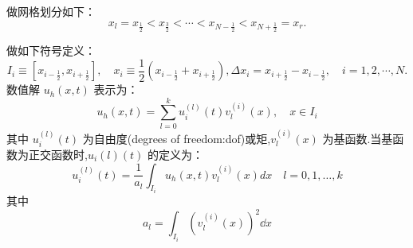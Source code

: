 \documentclass{book}
\begin{document}
做网格划分如下：
\begin{equation}
    x_{l}=x_{\frac{1}{2}}<x_{\frac{3}{2}}<\cdots<x_{N-\frac{1}{2}}<x_{N+\frac{1}{2}}=x_{r} .
\end{equation}

做如下符号定义：
\begin{equation}
    I_{i} \equiv\left[x_{i-\frac{1}{2}}, x_{i+\frac{1}{2}}\right], \quad x_{i} \equiv \frac{1}{2}\left(x_{i-\frac{1}{2}}+x_{i+\frac{1}{2}}\right),        \Delta x_{i}=x_{i+\frac{1}{2}}-x_{i-\frac{1}{2}}, \quad i=1,2, \cdots, N .
\end{equation}
数值解 $u_h(x,t)$ 表示为：
\begin{equation}
    u_{h}(x, t)=\sum_{l=0}^{k} u_{i}^{(l)}(t) v_{l}^{(i)}(x), \quad x \in I_{i}
\end{equation}
其中 $u_i^{(l)}(t)$ 为自由度(degrees of freedom:dof)或矩,$v_l^{(i)}(x)$ 为基函数.当基函数为正交函数时,$u_i{(l)}(t)$ 的定义为：
\begin{equation}
    u_{i}^{(l)}(t)=\frac{1}{a_{l}} \int_{I_{i}} u_{h}(x, t) v_{l}^{(i)}(x) d x \quad l=0,1, \ldots, k
\end{equation}
其中
\begin{equation}
    a_{l}=\int_{I_{i}}\left(v_{l}^{(i)}(x)\right)^{2} \dd x
\end{equation}
\end{document}
